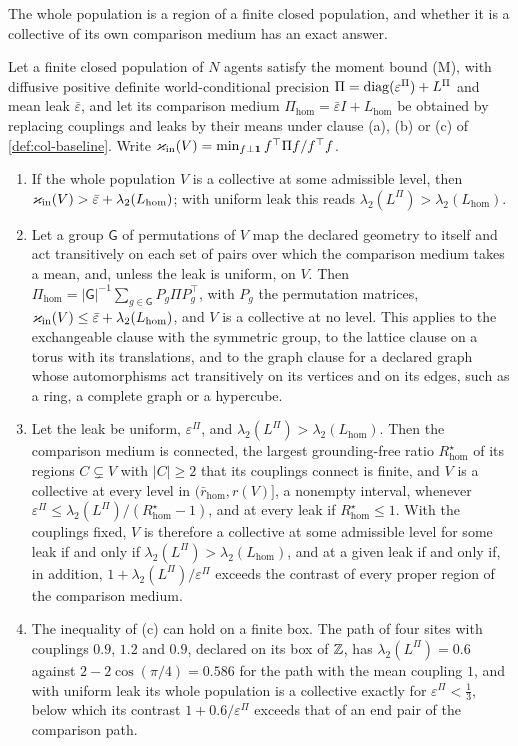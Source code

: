 The whole population is a region of a finite closed population, and whether it is a collective of its own comparison medium has an exact answer.

\begin{proposition}\label{prop:col-whole-population}
Let a finite closed population of $N$ agents satisfy the moment bound (M), with diffusive positive definite world-conditional precision $\Pi=\operatorname{diag}(\varepsilon^\Pi)+L^\Pi$ and mean leak $\bar\varepsilon$, and let its comparison medium $\Pi_{\mathrm{hom}}=\bar\varepsilon I+L_{\mathrm{hom}}$ be obtained by replacing couplings and leaks by their means under clause (a), (b) or (c) of \cref{def:col-baseline}. Write $\varkappa_{\mathrm{in}}(V)=\min_{f\perp\mathbf{1}}f^\top\Pi f/f^\top f$.
\begin{enumerate}
\item[(a)] If the whole population $V$ is a collective at some admissible level, then $\varkappa_{\mathrm{in}}(V)>\bar\varepsilon+\lambda_2(L_{\mathrm{hom}})$; with uniform leak this reads $\lambda_2(L^\Pi)>\lambda_2(L_{\mathrm{hom}})$.
\item[(b)] Let a group $\mathsf G$ of permutations of $V$ map the declared geometry to itself and act transitively on each set of pairs over which the comparison medium takes a mean, and, unless the leak is uniform, on $V$. Then $\Pi_{\mathrm{hom}}=|\mathsf G|^{-1}\sum_{g\in\mathsf G}P_g\Pi P_g^\top$, with $P_g$ the permutation matrices, $\varkappa_{\mathrm{in}}(V)\le\bar\varepsilon+\lambda_2(L_{\mathrm{hom}})$, and $V$ is a collective at no level. This applies to the exchangeable clause with the symmetric group, to the lattice clause on a torus with its translations, and to the graph clause for a declared graph whose automorphisms act transitively on its vertices and on its edges, such as a ring, a complete graph or a hypercube.
\item[(c)] Let the leak be uniform, $\varepsilon^\Pi$, and $\lambda_2(L^\Pi)>\lambda_2(L_{\mathrm{hom}})$. Then the comparison medium is connected, the largest grounding-free ratio $R^\star_{\mathrm{hom}}$ of its regions $C\subsetneq V$ with $|C|\ge2$ that its couplings connect is finite, and $V$ is a collective at every level in $(\bar r_{\mathrm{hom}},r(V)]$, a nonempty interval, whenever $\varepsilon^\Pi\le\lambda_2(L^\Pi)/(R^\star_{\mathrm{hom}}-1)$, and at every leak if $R^\star_{\mathrm{hom}}\le1$. With the couplings fixed, $V$ is therefore a collective at some admissible level for some leak if and only if $\lambda_2(L^\Pi)>\lambda_2(L_{\mathrm{hom}})$, and at a given leak if and only if, in addition, $1+\lambda_2(L^\Pi)/\varepsilon^\Pi$ exceeds the contrast of every proper region of the comparison medium.
\item[(d)] The inequality of (c) can hold on a finite box. The path of four sites with couplings $0.9$, $1.2$ and $0.9$, declared on its box of $\mathbb{Z}$, has $\lambda_2(L^\Pi)=0.6$ against $2-2\cos(\pi/4)=0.586$ for the path with the mean coupling $1$, and with uniform leak its whole population is a collective exactly for $\varepsilon^\Pi<\frac13$, below which its contrast $1+0.6/\varepsilon^\Pi$ exceeds that of an end pair of the comparison path.
\end{enumerate}
\end{proposition}
